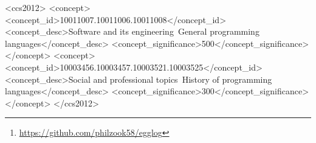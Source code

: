 \documentclass[sigplan,10pt,review]{acmart} %
\begin{document}
\begin{abstract}
There are many striking similarities between \emph{equality saturation} \cite{egg} and \emph{Datalog} \cite{datalog}. This talk is about a prototype implementation called Egglog0\footnote{\url{https://github.com/philzook58/egglog}} built upon the e-graph framework library egg \cite{egg} extended with \emph{multipatterns} and the modeling power equality saturation gains with the addition of logic programming constructs.
\end{abstract}


\begin{CCSXML}
<ccs2012>
<concept>
<concept_id>10011007.10011006.10011008</concept_id>
<concept_desc>Software and its engineering~General programming languages</concept_desc>
<concept_significance>500</concept_significance>
</concept>
<concept>
<concept_id>10003456.10003457.10003521.10003525</concept_id>
<concept_desc>Social and professional topics~History of programming languages</concept_desc>
<concept_significance>300</concept_significance>
</concept>
</ccs2012>
\end{CCSXML}





\maketitle
\end{document}
